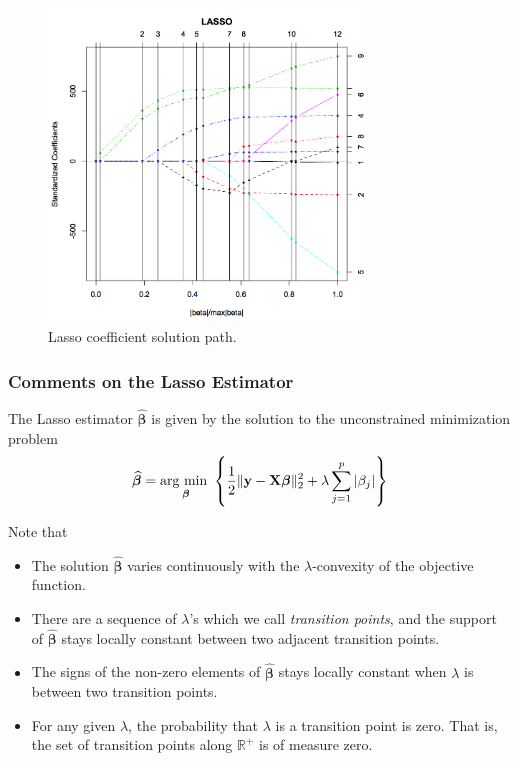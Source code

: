 \documentclass[twoside]{article}
\newcommand\R{\mathbb{R}}
\begin{document}
\begin{figure}[h!]
	\centering
	\includegraphics[width=0.75\textwidth]{img/lasso_path.png}
	\caption{Lasso coefficient solution path.}
\end{figure}

\subsubsection{Comments on the Lasso Estimator}

The Lasso estimator $\widehat {\bm \beta}$ is given by the solution to the unconstrained minimization problem
\begin{equation*}
	\widehat{\bm \beta} = \underset{{\bm \beta}}{\text{arg min~}} \left\{ \frac{1}{2} \| {\bf y} - {\bf X} {\bm \beta} \|^2_2 + \lambda \sum^p_{j = 1} |\beta_j| \right\}
\end{equation*}

Note that
\begin{itemize}
	\item The solution $\widehat {\bm \beta}$ varies continuously with the $\lambda$-convexity of the objective function.
	
	\item There are a sequence of $\lambda$'s which we call {\em transition points}, and the support of $\widehat {\bm \beta}$ stays locally constant between two adjacent transition points.
	
	\item The signs of the non-zero elements of $\widehat {\bm \beta}$ stays locally constant when $\lambda$ is between two transition points.
	
	\item For any given $\lambda$, the probability that $\lambda$ is a transition point is zero. That is, the set of transition points along $\R^+$ is of measure zero.
\end{itemize}
\end{document}
